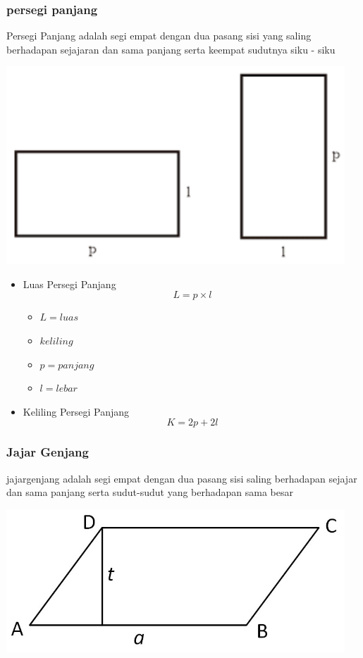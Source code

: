 \documentclass[12pt]{article}
\begin{document}
			\subsubsection{persegi panjang}
			Persegi Panjang adalah segi empat dengan dua pasang sisi yang saling berhadapan sejajaran dan sama panjang serta keempat sudutnya siku - siku 
			\begin{center}
						\includegraphics[width=5in]{persegi panjang.png}

			\end{center}
			\begin{itemize}
				\item Luas Persegi Panjang
				$$L=p \times l$$
				\begin{itemize}
				\item $L=luas$
				\item $keliling$
				\item $p=panjang$
				\item $l=lebar$
				\end{itemize}
				\item Keliling Persegi Panjang
				$$K=2p+2l$$
			\end{itemize}
			\subsubsection{Jajar Genjang}
			jajargenjang adalah segi empat dengan dua pasang sisi saling berhadapan sejajar dan sama panjang serta sudut-sudut yang berhadapan sama besar
			
			\begin{center}
				\includegraphics[width=5in]{rumus-luas-jajar-genjang.jpg}
			\end{center}
			
\end{document}
